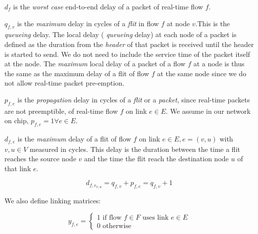 \documentclass[conference, twocolumn]{IEEEtran}
\theoremstyle{definition}
\begin{document}
$d_f$ is the {\em worst case} end-to-end delay of a packet of real-time flow
$f$.

$q_{f,v}$ is the {\em maximum} delay in cycles of a {\em flit} in
flow $f$ at node $v$.This is the {\em queueing} delay. The local delay ({\em
queueing} delay) at each node of a packet is defined as the duration from the
{\em header} of that  packet is received until the header is started to send.
We do not need to include the service time of the packet itself at the node.
The {\em maximum} local delay of a packet of a flow $f$ at a node is thus the
same as the maximum delay of a flit of flow $f$ at the same node since we do
not allow real-time packet pre-emption. %


$p_{f,e}$ is the {\em propagation} delay in cycles of a {\em flit} or
a {\em packet}, since real-time packets are not preemptible, of real-time flow
$f$ on link $e \in E$. We assume in our network on chip, $p_{f,e}=1 \forall e \in E$.


$d_{f,e}$ is the {\em maximum} delay of a flit of flow $f$ on link $e \in E,
e=(v,u)$ with $v,u \in V$ measured in cycles. This delay is the duration between
the time a flit reaches the source node $v$ and the time the flit reach the destination node
$u$ of that link $e$.

% 

\begin{equation}\label{equ:edgeDelay}
d_{f,e_{v,u}} = q_{f,v} + p_{f,e} = q_{f,v} + 1 
\end{equation}

We also define linking matrices:

\begin{equation}
y_{f,e} = \left\{ \begin{array}{lrc}
1 \mbox{ if flow } f \in F \mbox{ uses link } e \in E \\
0 \mbox{ otherwise} 
\end{array}\right.
\end{equation}
\end{document}
